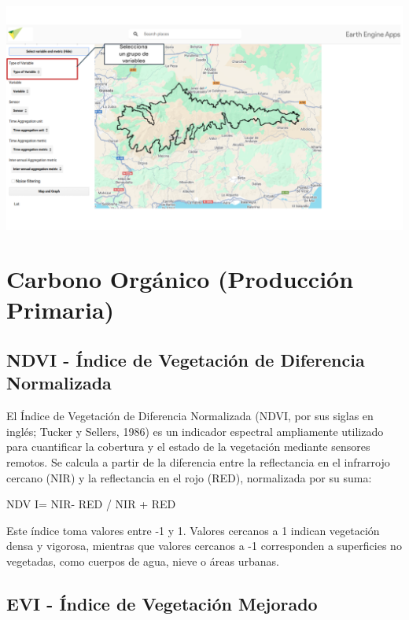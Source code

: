 \documentclass[
]{book}
\begin{document}
\includegraphics{assets/variables_es.png}

\section{\texorpdfstring{\textbf{Carbono Orgánico (Producción Primaria)}}{Carbono Orgánico (Producción Primaria)}}\label{carbono-orguxe1nico-producciuxf3n-primaria}

\subsection{\texorpdfstring{\textbf{NDVI} - Índice de Vegetación de Diferencia Normalizada}{NDVI - Índice de Vegetación de Diferencia Normalizada}}\label{ndvi---uxedndice-de-vegetaciuxf3n-de-diferencia-normalizada}

El Índice de Vegetación de Diferencia Normalizada (NDVI, por sus siglas en inglés; Tucker y Sellers, 1986) es un indicador espectral ampliamente utilizado para cuantificar la cobertura y el estado de la vegetación mediante sensores remotos. Se calcula a partir de la diferencia entre la reflectancia en el infrarrojo cercano (NIR) y la reflectancia en el rojo (RED), normalizada por su suma:

NDV I= NIR- RED / NIR + RED

Este índice toma valores entre -1 y 1. Valores cercanos a 1 indican vegetación densa y vigorosa, mientras que valores cercanos a -1 corresponden a superficies no vegetadas, como cuerpos de agua, nieve o áreas urbanas.

\subsection{\texorpdfstring{\textbf{EVI} - Índice de Vegetación Mejorado}{EVI - Índice de Vegetación Mejorado}}\label{evi---uxedndice-de-vegetaciuxf3n-mejorado}
\end{document}

